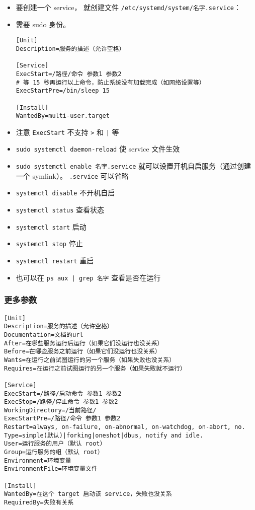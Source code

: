 
\begin{issues}
\issueDraft
\end{issues}

\begin{itemize}
\item 要创建一个 service， 就创建文件 \verb|/etc/systemd/system/名字.service|：
\item 需要 sudo 身份。
\begin{lstlisting}[language=none,caption=名字.service]
[Unit]
Description=服务的描述（允许空格）

[Service]
ExecStart=/路径/命令 参数1 参数2
# 等 15 秒再运行以上命令，防止系统没有加载完成（如网络设置等）
ExecStartPre=/bin/sleep 15

[Install]
WantedBy=multi-user.target
\end{lstlisting}
\item 注意 \verb|ExecStart| 不支持 \verb|>| 和 \verb`|` 等
\item \verb|sudo systemctl daemon-reload| 使 service 文件生效
\item \verb|sudo systemctl enable 名字.service| 就可以设置开机自启服务（通过创建一个 symlink）。 \verb`.service` 可以省略
\item \verb|systemctl disable| 不开机自启
\item \verb|systemctl status| 查看状态
\item \verb|systemctl start| 启动
\item \verb|systemctl stop| 停止
\item \verb|systemctl restart| 重启
\item 也可以在 \verb`ps aux | grep 名字` 查看是否在运行
\end{itemize}

\subsubsection{更多参数}
\begin{lstlisting}[language=none,caption=名字.service]
[Unit]
Description=服务的描述（允许空格）
Documentation=文档的url
After=在哪些服务运行后运行（如果它们没运行也没关系）
Before=在哪些服务之前运行（如果它们没运行也没关系）
Wants=在运行之前试图运行的另一个服务（如果失败也没关系）
Requires=在运行之前试图运行的另一个服务（如果失败就不运行）

[Service]
ExecStart=/路径/启动命令 参数1 参数2
ExecStop=/路径/停止命令 参数1 参数2
WorkingDirectory=/当前路径/
ExecStartPre=/路径/命令 参数1 参数2
Restart=always, on-failure, on-abnormal, on-watchdog, on-abort, no.
Type=simple(默认)|forking|oneshot|dbus, notify and idle.
User=运行服务的用户（默认 root）
Group=运行服务的组（默认 root）
Environment=环境变量
EnvironmentFile=环境变量文件

[Install]
WantedBy=在这个 target 启动该 service，失败也没关系
RequiredBy=失败有关系
\end{lstlisting}

